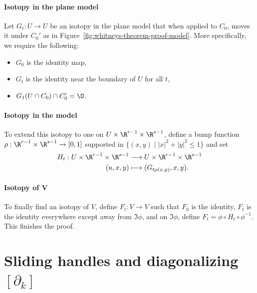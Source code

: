 \begin{myproof}
    \paragraph{Isotopy in the plane model}
    Let $G_t: U \to U$ be an isotopy in the plane model that when applied to $C_0$, moves it under $C_0'$ as in Figure~\ref{fig:whitneys-theorem-proof-model}.
    More specifically, we require the following:
    \begin{itemize}
        \item $G_0$ is the identity map,
        \item $G_t$ is the identity near the boundary of  $U$ for all $t$,
        \item  $ G_1(U \cap C_0) \cap C_0' = \O$.
    \end{itemize}
    \paragraph{Isotopy in the model}
    To extend this isotopy to one on $U \times \R^{r-1} \times \R^{s-1}$, define a bump function $\rho: \R^{r-1}\times \R^{s-1} \to  [0,1]$ supported in $\{(x, y)  \mid |x|^2 + |y|^2 \le  1\}$ and set
    \begin{align*}
        H_t: U \times \R^{r-1}\times \R^{s-1} &\longrightarrow  U \times \R^{r-1} \times \R^{s-1}\\
        (u, x, y) &\longmapsto (G_{t \rho(x, y)}, x, y)
    .\end{align*}
    \paragraph{Isotopy of $\bm{V}$}
    To finally find an isotopy of $V$, define $F_t: V\to V$ such that
    $F_0$ is the identity, $F_t$ is the identity everywhere except away from  $\Im \phi$, and on  $\Im \phi$, define  $F_t = \phi  \circ  H_t  \circ  \phi^{-1}$.
    This finishes the proof.
\end{myproof}

\section{Sliding handles and diagonalizing $[\partial_k]$}

